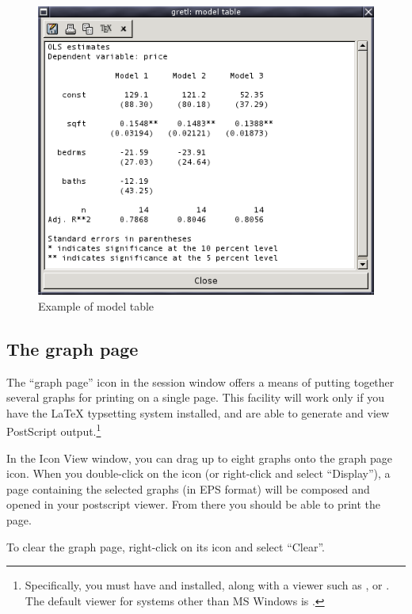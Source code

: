 \begin{figure}[htbp]
  \begin{center}
    \includegraphics[scale=0.5]{figures/model_table}
  \end{center}
  \caption{Example of model table}
  \label{fig-model-table}
\end{figure}


\subsection{The graph page}
\label{sect-graphpage}

The ``graph page'' icon in the session window offers a means of
putting together several graphs for printing on a single page.  This
facility will work only if you have the {\LaTeX} typsetting system
installed, and are able to generate and view PostScript
output.\footnote{Specifically, you must have  and
   installed, along with a viewer such as ,
   or . The default viewer for systems other
  than MS Windows is .}  

In the Icon View window, you can drag up to eight graphs onto the
graph page icon.  When you double-click on the icon (or right-click
and select ``Display''), a page containing the selected graphs (in EPS
format) will be composed and opened in your postscript viewer.  From
there you should be able to print the page.

To clear the graph page, right-click on its icon and select ``Clear''.

